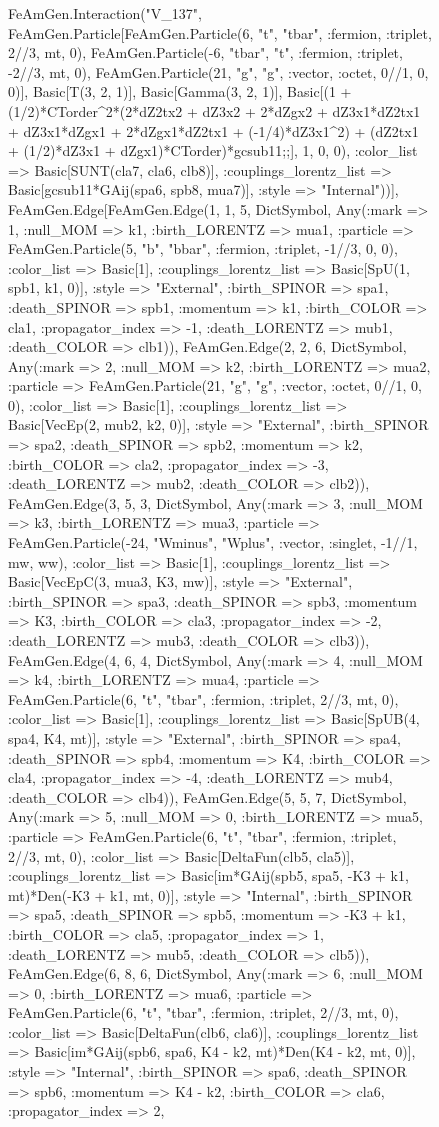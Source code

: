\documentclass{revtex4}
\begin{document}
\begin{figure}[!htb]
\begin{center}
{FeAmGen.Interaction("V_137", FeAmGen.Particle[FeAmGen.Particle(6, "t", "tbar", :fermion, :triplet, 2//3, mt, 0), FeAmGen.Particle(-6, "tbar", "t", :fermion, :triplet, -2//3, mt, 0), FeAmGen.Particle(21, "g", "g", :vector, :octet, 0//1, 0, 0)], Basic[T(3, 2, 1)], Basic[Gamma(3, 2, 1)], Basic[(1 + (1/2)*CTorder^2*(2*dZ2tx2 + dZ3x2 + 2*dZgx2 + dZ3x1*dZ2tx1 + dZ3x1*dZgx1 + 2*dZgx1*dZ2tx1 + (-1/4)*dZ3x1^2) + (dZ2tx1 + (1/2)*dZ3x1 + dZgx1)*CTorder)*gcsub11;;], 1, 0, 0), :color_list => Basic[SUNT(cla7, cla6, clb8)], :couplings_lorentz_list => Basic[gcsub11*GAij(spa6, spb8, mua7)], :style => "Internal"))], FeAmGen.Edge[FeAmGen.Edge(1, 1, 5, Dict{Symbol, Any}(:mark => 1, :null_MOM => k1, :birth_LORENTZ => mua1, :particle => FeAmGen.Particle(5, "b", "bbar", :fermion, :triplet, -1//3, 0, 0), :color_list => Basic[1], :couplings_lorentz_list => Basic[SpU(1, spb1, k1, 0)], :style => "External", :birth_SPINOR => spa1, :death_SPINOR => spb1, :momentum => k1, :birth_COLOR => cla1, :propagator_index => -1, :death_LORENTZ => mub1, :death_COLOR => clb1)), FeAmGen.Edge(2, 2, 6, Dict{Symbol, Any}(:mark => 2, :null_MOM => k2, :birth_LORENTZ => mua2, :particle => FeAmGen.Particle(21, "g", "g", :vector, :octet, 0//1, 0, 0), :color_list => Basic[1], :couplings_lorentz_list => Basic[VecEp(2, mub2, k2, 0)], :style => "External", :birth_SPINOR => spa2, :death_SPINOR => spb2, :momentum => k2, :birth_COLOR => cla2, :propagator_index => -3, :death_LORENTZ => mub2, :death_COLOR => clb2)), FeAmGen.Edge(3, 5, 3, Dict{Symbol, Any}(:mark => 3, :null_MOM => k3, :birth_LORENTZ => mua3, :particle => FeAmGen.Particle(-24, "Wminus", "Wplus", :vector, :singlet, -1//1, mw, ww), :color_list => Basic[1], :couplings_lorentz_list => Basic[VecEpC(3, mua3, K3, mw)], :style => "External", :birth_SPINOR => spa3, :death_SPINOR => spb3, :momentum => K3, :birth_COLOR => cla3, :propagator_index => -2, :death_LORENTZ => mub3, :death_COLOR => clb3)), FeAmGen.Edge(4, 6, 4, Dict{Symbol, Any}(:mark => 4, :null_MOM => k4, :birth_LORENTZ => mua4, :particle => FeAmGen.Particle(6, "t", "tbar", :fermion, :triplet, 2//3, mt, 0), :color_list => Basic[1], :couplings_lorentz_list => Basic[SpUB(4, spa4, K4, mt)], :style => "External", :birth_SPINOR => spa4, :death_SPINOR => spb4, :momentum => K4, :birth_COLOR => cla4, :propagator_index => -4, :death_LORENTZ => mub4, :death_COLOR => clb4)), FeAmGen.Edge(5, 5, 7, Dict{Symbol, Any}(:mark => 5, :null_MOM => 0, :birth_LORENTZ => mua5, :particle => FeAmGen.Particle(6, "t", "tbar", :fermion, :triplet, 2//3, mt, 0), :color_list => Basic[DeltaFun(clb5, cla5)], :couplings_lorentz_list => Basic[im*GAij(spb5, spa5, -K3 + k1, mt)*Den(-K3 + k1, mt, 0)], :style => "Internal", :birth_SPINOR => spa5, :death_SPINOR => spb5, :momentum => -K3 + k1, :birth_COLOR => cla5, :propagator_index => 1, :death_LORENTZ => mub5, :death_COLOR => clb5)), FeAmGen.Edge(6, 8, 6, Dict{Symbol, Any}(:mark => 6, :null_MOM => 0, :birth_LORENTZ => mua6, :particle => FeAmGen.Particle(6, "t", "tbar", :fermion, :triplet, 2//3, mt, 0), :color_list => Basic[DeltaFun(clb6, cla6)], :couplings_lorentz_list => Basic[im*GAij(spb6, spa6, K4 - k2, mt)*Den(K4 - k2, mt, 0)], :style => "Internal", :birth_SPINOR => spa6, :death_SPINOR => spb6, :momentum => K4 - k2, :birth_COLOR => cla6, :propagator_index => 2, }
\end{center}
\end{figure}
\end{document}
